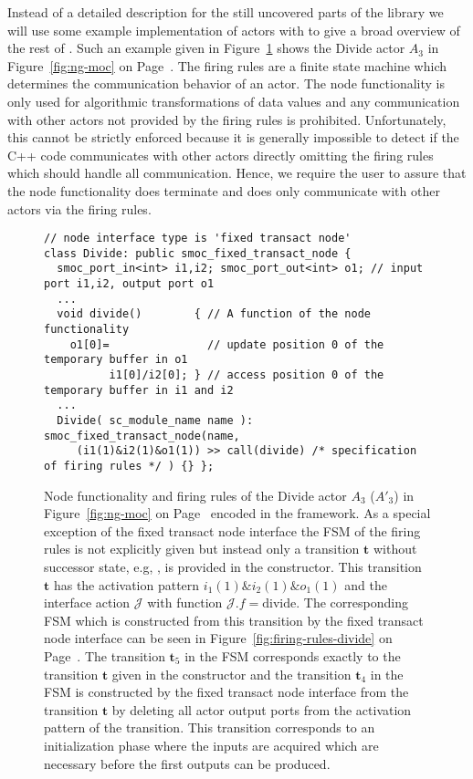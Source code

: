 Instead of a detailed description for the still uncovered parts of the \SysteMoC{} library we
will use some example implementation of actors with \SysteMoC{} to give a broad overview
of the rest of \SysteMoC{}.
Such an example given in Figure~\ref{systemoc-divide-actor} shows the Divide actor $A_3$ in
Figure~\ref{fig:ng-moc} on Page~\pageref{fig:ng-moc}.
The firing rules are a finite state machine which determines
the communication behavior of an actor.
The node functionality is only used for algorithmic transformations of
data values and any communication with other actors not provided
by the firing rules is prohibited.
Unfortunately, this cannot be strictly enforced because it is generally
impossible to detect if the C++ code communicates with other actors
directly omitting the firing rules which should handle all communication.
Hence, we require the \SysteMoC{} user
to assure that the node functionality does terminate and does only
communicate with other actors via the firing rules.

\begin{figure}[t]
\centering
\begin{verbatim}
// node interface type is 'fixed transact node'
class Divide: public smoc_fixed_transact_node { 
  smoc_port_in<int> i1,i2; smoc_port_out<int> o1; // input port i1,i2, output port o1
  ...
  void divide()        { // A function of the node functionality
    o1[0]=               // update position 0 of the temporary buffer in o1
          i1[0]/i2[0]; } // access position 0 of the temporary buffer in i1 and i2
  ...
  Divide( sc_module_name name ): smoc_fixed_transact_node(name,
     (i1(1)&i2(1)&o1(1)) >> call(divide) /* specification of firing rules */ ) {} };
\end{verbatim}
\caption{\label{systemoc-divide-actor}Node functionality and firing rules of
the Divide actor $A_3$ ($A'_3$) in Figure~\ref{fig:ng-moc} on 
Page~\pageref{fig:ng-moc} encoded in the \SysteMoC{} framework.
As a special exception of the fixed transact node interface the FSM of
the firing rules is not explicitly given but instead only a transition
$\mathbf{t}$ without successor state,
e.g, , is provided in
the constructor. This transition $\mathbf{t}$ has the activation pattern
$i_1(1) \& i_2(1) \& o_1(1)$ and the interface action $\mathcal{J}$ with function
$\mathcal{J}.f = \mathrm{divide}$. 
The corresponding FSM which is constructed from this transition by
the fixed transact node interface can be seen in
Figure~\ref{fig:firing-rules-divide} on Page~\pageref{fig:firing-rules-divide}.
The transition $\mathbf{t}_5$ in the FSM corresponds exactly to the
transition $\mathbf{t}$ given in the constructor and the transition
$\mathbf{t}_4$ in the FSM is constructed by the fixed transact node interface
from the transition $\mathbf{t}$ by deleting all actor output ports from
the activation pattern of the transition. This transition corresponds to an
initialization phase where the inputs are acquired which are necessary
before the first outputs can be produced.}
\end{figure}


